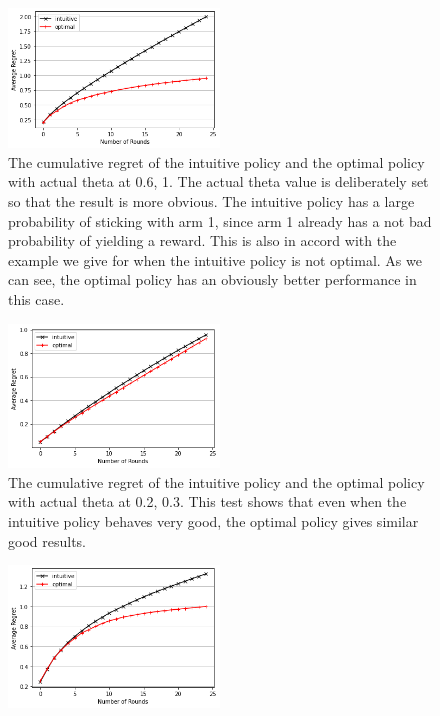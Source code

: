 \documentclass{article}
\begin{document}
\begin{homeworkProblem}
\begin{enumerate}[1.]
        \begin{figure}[htp]
            \centering
            \includegraphics[width = 0.5\textwidth]{part2.png}
            \caption{The cumulative regret of the intuitive policy and the optimal policy with actual theta at 0.6, 1. The actual theta value is deliberately set so that the result is more obvious. The intuitive policy has a large probability of sticking with arm 1, since arm 1 already has a not bad probability of yielding a reward. This is also in accord with the example we give for when the intuitive policy is not optimal. As we can see, the optimal policy has an obviously better performance in this case.}
            \label{fig4}
        \end{figure}
        \begin{figure}[htp]
            \centering
            \includegraphics[width = 0.5\textwidth]{part2(2).png}
            \caption{The cumulative regret of the intuitive policy and the optimal policy with actual theta at 0.2, 0.3. This test shows that even when the intuitive policy behaves very good, the optimal policy gives similar good results.}
            \label{fig5}
        \end{figure}
        \begin{figure}[htp]
            \centering
            \includegraphics[width = 0.5\textwidth]{part2(3).png}

\end{figure}
\end{enumerate}
\end{homeworkProblem}
\end{document}
